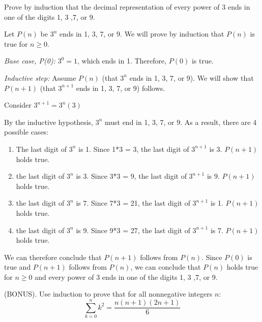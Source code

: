 \documentclass[solution, letterpaper]{cs20}
\begin{document}
        \problem{}{}

        Prove by induction that the decimal representation of every power of $3$ ends in one of the digits 1, 3 ,7, or 9.

        \begin{solution}

        Let $P(n)$ be $3^n$ ends in 1, 3, 7, or 9. We will prove by induction that $P(n)$ is true for $n\geq0$.

        \textit{Base case, P(0):} $3^0 = 1$, which ends in 1. Therefore, $P(0)$ is true.

        \textit{Inductive step:} Assume $P(n)$ (that $3^n$ ends in 1, 3, 7, or 9). We will show that $P(n+1)$ (that $3^{n+1}$ ends in 1, 3, 7, or 9) follows.

        Consider $3^{n+1} = 3^n (3)$

        By the inductive hypothesis, $3^n$ must end in 1, 3, 7, or 9. As a result, there are 4 possible cases:

        \begin{enumerate}

        \item The last digit of $3^n$ is 1. Since 1*3 = 3, the last digit of $3^{n+1}$ is 3. $P(n+1)$ holds true.

        \item the last digit of $3^n$ is 3. Since 3*3 = 9, the last digit of $3^{n+1}$ is 9. $P(n+1)$ holds true.

        \item the last digit of $3^n$ is 7. Since 7*3 = 21, the last digit of $3^{n+1}$ is 1. $P(n+1)$ holds true.

        \item the last digit of $3^n$ is 9. Since 9*3 = 27, the last digit of $3^{n+1}$ is 7. $P(n+1)$ holds true.

        \end{enumerate}

        We can therefore conclude that $P(n+1)$ follows from $P(n)$. Since $P(0)$ is true and $P(n+1)$ follows from $P(n)$, we can conclude that $P(n)$ holds true for $n \geq 0$ and every power of $3$ ends in one of the digits 1, 3 ,7, or 9.

        \end{solution}

        \problem{}{}

        (BONUS). Use induction to prove that for all nonnegative integers $n$:
        \[ \sum_{k=0}^{n}k^{2}=\frac{n(n+1)(2n+1)}{6} \]
\end{document}
